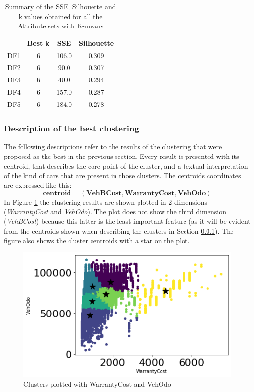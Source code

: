 \documentclass{article}
\begin{document}
	\begin{table}[H]
		\centering
		\begin{tabular}{|c|ccc|}
			\hline
			&  Best k & SSE& Silhouette \\
			\hline
			\rowcolor{Gray}
			DF1 & 6 & 106.0 & 0.309 \\
			DF2 & 6 & 90.0 & 0.307  \\
			\rowcolor{Gray}
			DF3 & 6 & 40.0 & 0.294 \\
			DF4 & 6 & 157.0 & 0.287  \\
			\rowcolor{Gray}
			DF5 & 6 & 184.0\textbf & 0.278 \\
			\hline
		\end{tabular}
		\caption{{Summary of the SSE, Silhouette and k values obtained for all the Attribute sets with K-means}}
		\label{tab:SSESilu}
	\end{table}
	
	
	\subsubsection{Description of the best clustering}
	\label{sec:clusterdescr}
	The following descriptions refer to the results of the clustering that were proposed as the best in the previous section. Every result is presented with its centroid, that describes the core point of the cluster, and a textual interpretation of the kind of cars that are present in those clusters. 
	The centroids coordinates are expressed like this:  
	$$ \mathbf{centroid} = (\mathbf{VehBCost}, \mathbf{WarrantyCost}, \mathbf{VehOdo}) $$
	In Figure \ref{fig:centroid} the clustering results are shown plotted in 2 dimensions (\emph{WarrantyCost} and \emph{VehOdo}). The plot does not show the third dimension (\emph{VehBCost}) because this latter is the least important feature (as it will be evident from the centroids shown when describing the clusters in Section \ref{sec:clusterdescr}).
	The figure also shows the cluster centroids with a star on the plot. 
	
	\begin{figure}[H]
		\centering
		\includegraphics[width=.7\textwidth, keepaspectratio]{centroid}
		\caption{{Clusters plotted with WarrantyCost and VehOdo}}
		\label{fig:centroid}
	\end{figure}
	
\end{document}
